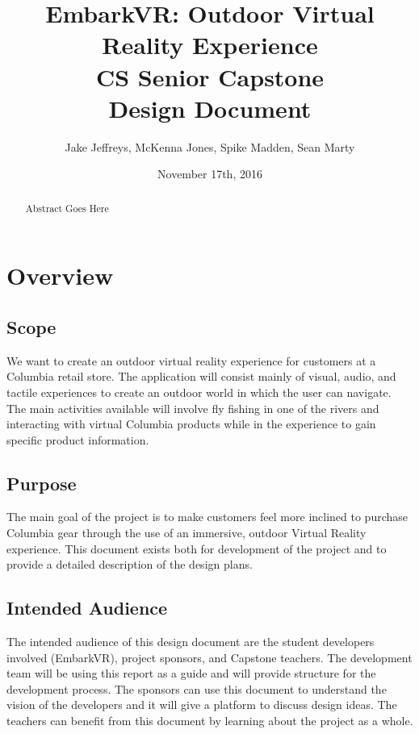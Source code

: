 \documentclass[10pt,journal,compsoc,onecolumn, draftclsnofoot]{IEEEtran}
\title{
EmbarkVR: Outdoor Virtual Reality Experience \\
CS Senior Capstone \\
Design Document\\
\vspace{3cm}
}
\author{Jake Jeffreys, McKenna Jones, Spike Madden, Sean Marty}
\date{November 17th, 2016}
\begin{document}
\begin{titlepage}
\vspace{3cm}
\maketitle
\vspace{3cm}
\begin{abstract}
Abstract Goes Here
\end{abstract}

\end{titlepage}
\tableofcontents
\clearpage

\section{Overview}
\subsection{Scope}
We want to create an outdoor virtual reality experience for customers at a Columbia retail store. The application will consist mainly of visual, audio, and tactile experiences to create an outdoor world in which the user can navigate. The main activities available will involve fly fishing in one of the rivers and interacting with virtual Columbia products while in the experience to gain specific product information.

\subsection{Purpose}
The main goal of the project is to make customers feel more inclined to purchase Columbia gear through the use of an immersive, outdoor Virtual Reality experience. This document exists both for development of the project and to provide a detailed description of the design plans.

\subsection{Intended Audience}
The intended audience of this design document are the student developers involved (EmbarkVR), project sponsors, and Capstone teachers. The development team will be using this report as a guide and will provide structure for the development process. The sponsors can use this document to understand the vision of the developers and it will give a platform to discuss design ideas. The teachers can benefit from this document by learning about the project as a whole.
\end{document}
